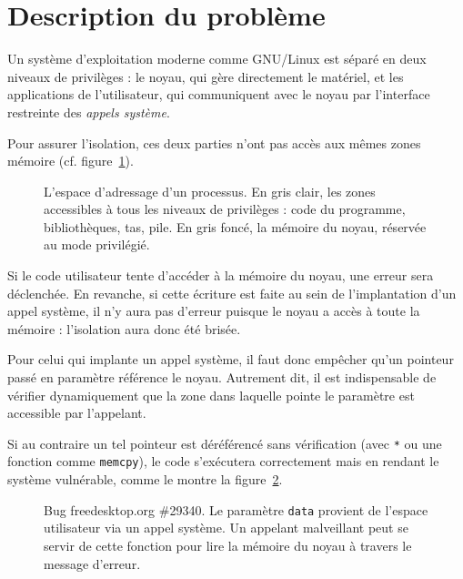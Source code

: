 \section{Description du problème}


Un système d'exploitation moderne comme GNU/Linux est séparé en deux niveaux de
privilèges : le noyau, qui gère directement le matériel, et les applications de
l'utilisateur, qui communiquent avec le noyau par l'interface restreinte des
\emph{appels système}.

Pour assurer l'isolation, ces deux parties n'ont pas accès aux mêmes zones
mémoire (cf. figure~\ref{fig:memmap}).


\begin{figure}
\centering
\fbox{
  
}

\caption{L'espace d'adressage d'un processus. En gris clair, les zones
accessibles à tous les niveaux de privilèges : code du programme, bibliothèques,
tas, pile. En gris foncé, la mémoire du noyau, réservée au mode privilégié.}

\label{fig:memmap}
\end{figure}

Si le code utilisateur tente d'accéder à la mémoire du noyau, une erreur sera
déclenchée. En revanche, si cette écriture est faite au sein de l'implantation
d'un appel système, il n'y aura pas d'erreur puisque le noyau a accès à toute la
mémoire : l'isolation aura donc été brisée.

Pour celui qui implante un appel système, il faut donc empêcher qu'un pointeur
passé en paramètre référence le noyau. Autrement dit, il est indispensable de
vérifier dynamiquement que la zone dans laquelle pointe le paramètre est
accessible par l'appelant\cite{hardy88confused}.

Si au contraire un tel pointeur est déréférencé sans vérification (avec
\texttt{*} ou une fonction comme \texttt{memcpy}), le code s'exécutera
correctement mais en rendant le système vulnérable, comme le montre la
figure~\ref{fig:radeon-bug}.

\begin{figure}

  \caption{Bug freedesktop.org \#29340. Le paramètre \texttt{data} provient de
    l'espace utilisateur via un appel système. Un appelant malveillant peut se
    servir de cette fonction pour lire la mémoire du noyau à travers le message
    d'erreur.}

  \label{fig:radeon-bug}
\end{figure}


